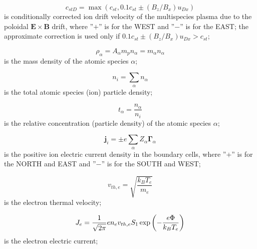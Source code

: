 \documentclass[11pt]{article}
\begin{document}
\bigskip

\begin{equation}
c_{stD}=\max(c_{st},0.1c_{st}\pm\left( B_{z}/B_{x}\right) u_{Dx}) 
\label{12}
\end{equation}
is conditionally corrected ion drift velocity of the multispecies plasma due
to the poloidal $\mathbf{E\times B}$ drift, where ''$+$'' is for the WEST
and ''$-$'' is for the EAST; the approximate correction is used only if $%
0.1c_{st}\pm\left( B_{z}/B_{x}\right) u_{Dx}>c_{st}$;

\bigskip

\begin{equation}
\rho_{\alpha}=A_{\alpha}m_{p}n_{\alpha}=m_{\alpha}n_{\alpha}   \label{13}
\end{equation}
is the mass density of the atomic species $\alpha$;

\bigskip

\begin{equation}
n_{i}=\sum_{\alpha}n_{\alpha}   \label{14}
\end{equation}
is the total atomic species (ion) particle density;

\bigskip

\begin{equation}
t_{\alpha}=\frac{n_{\alpha}}{n_{i}}   \label{15}
\end{equation}
is the relative concentration (particle density) of the atomic species $%
\alpha$;

\bigskip

\begin{equation}
\mathbf{j}_{i}=\pm e\sum_{\alpha}Z_{\alpha}\mathbf{\Gamma}_{\alpha} 
\label{16}
\end{equation}
is the positive ion electric current density in the boundary cells, where ''$%
+$'' is for the NORTH and EAST and ''$-$'' is for the SOUTH and WEST;

\bigskip

\begin{equation}
v_{th,e}=\sqrt{\frac{k_{B}T_{e}}{m_{e}}}   \label{17}
\end{equation}
is the electron thermal velocity;

\bigskip

\begin{equation}
J_{e}=\frac{1}{\sqrt{2\pi}}en_{e}v_{th,e}S_{1}\exp\left( -\frac{e\Phi}{%
k_{B}T_{e}}\right)   \label{18}
\end{equation}
is the electron electric current;

\bigskip
\end{document}
